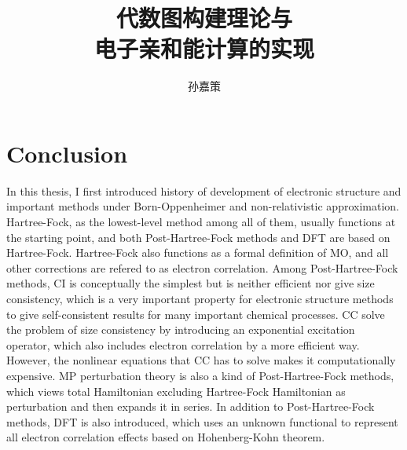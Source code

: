 \documentclass[bachelor, english]{ustcthesis}
\title{代数图构建理论与\\电子亲和能计算的实现}
\author{孙嘉策}
\begin{document}
\maketitle
\makestatement

\frontmatter

\tableofcontents
%


\mainmatter










\chapter{Conclusion}
In this thesis, I first introduced history of development of electronic structure and important methods under Born-Oppenheimer and non-relativistic approximation.
Hartree-Fock, as the lowest-level method among all of them, usually functions at the starting point, and both Post-Hartree-Fock methods and DFT are based on Hartree-Fock.
Hartree-Fock also functions as a formal definition of MO, and all other corrections are refered to as electron correlation.
Among Post-Hartree-Fock methods, CI is conceptually the simplest but is neither efficient nor give size consistency, which is a very important property for electronic structure methods to give self-consistent results for many important chemical processes.
CC solve the problem of size consistency by introducing an exponential excitation operator, which also includes electron correlation by a more efficient way.
However, the nonlinear equations that CC has to solve makes it computationally expensive.
MP perturbation theory is also a kind of Post-Hartree-Fock methods, which views total Hamiltonian excluding Hartree-Fock Hamiltonian as perturbation and then expands it in series.
In addition to Post-Hartree-Fock methods, DFT is also introduced, which uses an unknown functional to represent all electron correlation effects based on Hohenberg-Kohn theorem.
\end{document}
